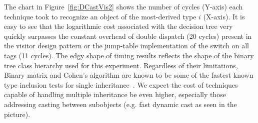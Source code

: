 The chart in Figure~\ref{fig:DCastVis2} shows the number of cycles (Y-axis) each 
technique took to recognize an object of the most-derived type $i$ (X-axis). It 
is easy to see that the logarithmic cost associated with the decision tree very 
quickly surpasses the constant overhead of double dispatch (20 cycles) present 
in the visitor design pattern or the jump-table implementation of the switch on 
all tags (11 cycles). The edgy shape of timing results reflects the shape of the
binary tree class hierarchy used for this experiment. Regardless of their 
limitations, Binary matrix and Cohen's algorithm are known to be some of the 
fastest known type inclusion tests for single inheritance~\cite{Vitek97}. We 
expect the cost of techniques capable of handling multiple inheritance be even 
higher, especially those addressing casting between subobjects (e.g. fast 
dynamic cast as seen in the picture). 
